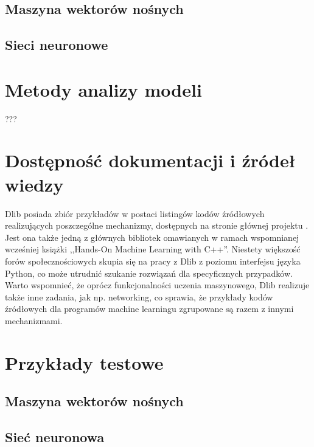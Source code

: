 \subsection{Maszyna wektorów nośnych}
\subsection{Sieci neuronowe}

\section{Metody analizy modeli}

???

\section{Dostępność dokumentacji i źródeł wiedzy}

Dlib posiada zbiór przykładów w postaci listingów kodów źródłowych realizujących poszczególne mechanizmy, dostępnych na stronie głównej projektu \cite{dlib:home}. Jest ona także jedną z głównych bibliotek omawianych w ramach wspomnianej wcześniej książki ,,Hands-On Machine Learning with C++''. Niestety większość forów społecznościowych skupia się na pracy z Dlib z poziomu interfejsu języka Python, co może utrudnić szukanie rozwiązań dla specyficznych przypadków. Warto wspomnieć, że oprócz funkcjonalności uczenia maszynowego, Dlib realizuje także inne zadania, jak np. networking, co sprawia, że przykłady kodów źródłowych dla programów machine learningu zgrupowane są razem z innymi mechanizmami. 

\section{Przykłady testowe}

\subsection{Maszyna wektorów nośnych}
\subsection{Sieć neuronowa}